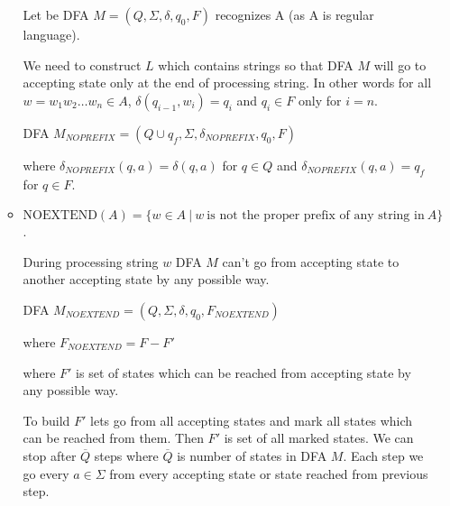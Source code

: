 \begin{enumerate}
\begin{itemize}
                    Let be DFA $M = (Q, \Sigma, \delta, q_0, F)$ recognizes A (as A is regular language).

                    We need to construct $L$ which contains strings so that DFA $M$ will go to accepting state only at the end of processing string. In other words for all $w = w_1w_2\ldots w_n \in A$, $\delta(q_{i-1}, w_i) = q_{i}$ and $q_i \in F$ only for $i = n$.

                    DFA $M_{NOPREFIX} = (Q \cup {q_f}, \Sigma, \delta_{NOPREFIX}, q_0, F)$

                    where $\delta_{NOPREFIX}(q, a) = \delta(q, a)$ for $q \in Q$ and $\delta_{NOPREFIX}(q, a) = q_f$ for $q \in F$.
                    

              \item $\text{NOEXTEND}(A)=\{w \in A~|~w~ \text{is not the proper prefix of any string in}~ A\}$.

                During processing string $w$ DFA $M$ can't go from accepting state to another accepting state by any possible way.

                DFA $M_{NOEXTEND} = (Q, \Sigma, \delta, q_0, F_{NOEXTEND})$

                where $F_{NOEXTEND} = F - F'$

                where $F'$ is set of states which can be reached from accepting state by any possible way.

                To build $F'$ lets go from all accepting states and mark all states which can be reached from them. Then $F'$ is set of all marked states. We can stop after $\overline{Q}$ steps where $\overline{Q}$ is number of states in DFA $M$. Each step we go every $a \in \Sigma$ from every accepting state or state reached from previous step.
          \end{itemize}
\end{enumerate}
